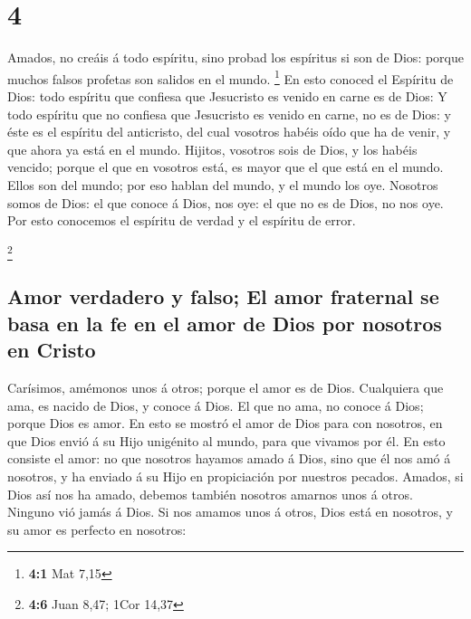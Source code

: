 \hypertarget{section-3}{%
\section{4}\label{section-3}}

 Amados, no creáis á todo espíritu, sino probad los
espíritus si son de Dios: porque muchos falsos profetas son salidos en
el mundo. \footnote{\textbf{4:1} Mat 7,15}  En esto
conoced el Espíritu de Dios: todo espíritu que confiesa que Jesucristo
es venido en carne es de Dios:  Y todo espíritu que no
confiesa que Jesucristo es venido en carne, no es de Dios: y éste es el
espíritu del anticristo, del cual vosotros habéis oído que ha de venir,
y que ahora ya está en el mundo.  Hijitos, vosotros sois
de Dios, y los habéis vencido; porque el que en vosotros está, es mayor
que el que está en el mundo.  Ellos son del mundo; por eso
hablan del mundo, y el mundo los oye.  Nosotros somos de
Dios: el que conoce á Dios, nos oye: el que no es de Dios, no nos oye.
Por esto conocemos el espíritu de verdad y el espíritu de error.

\footnote{\textbf{4:6} Juan 8,47; 1Cor 14,37}

\hypertarget{amor-verdadero-y-falso-el-amor-fraternal-se-basa-en-la-fe-en-el-amor-de-dios-por-nosotros-en-cristo}{%
\subsection{Amor verdadero y falso; El amor fraternal se basa en la fe
en el amor de Dios por nosotros en
Cristo}\label{amor-verdadero-y-falso-el-amor-fraternal-se-basa-en-la-fe-en-el-amor-de-dios-por-nosotros-en-cristo}}

 Carísimos, amémonos unos á otros; porque el amor es de
Dios. Cualquiera que ama, es nacido de Dios, y conoce á Dios.
 El que no ama, no conoce á Dios; porque Dios es amor.
 En esto se mostró el amor de Dios para con nosotros, en
que Dios envió á su Hijo unigénito al mundo, para que vivamos por él.
 En esto consiste el amor: no que nosotros hayamos amado
á Dios, sino que él nos amó á nosotros, y ha enviado á su Hijo en
propiciación por nuestros pecados.  Amados, si Dios así
nos ha amado, debemos también nosotros amarnos unos á otros.
 Ninguno vió jamás á Dios. Si nos amamos unos á otros,
Dios está en nosotros, y su amor es perfecto en nosotros:

